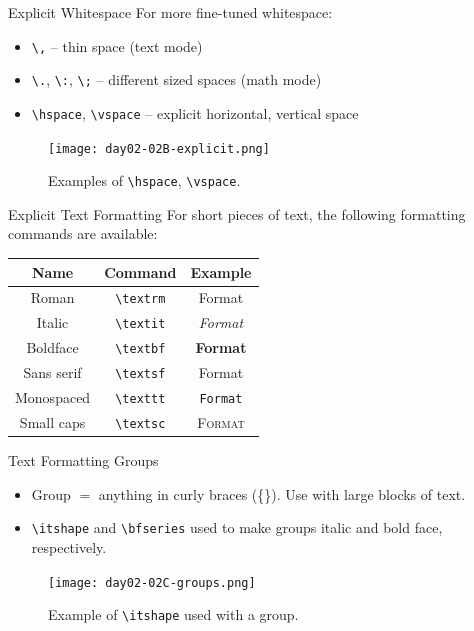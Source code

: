 \documentclass{beamer}
\begin{document}
{  \begin{frame}{Explicit Whitespace}
    For more fine-tuned whitespace:
    \begin{itemize}
      \item \texttt{\textbackslash,} -- thin space (text mode)
      \item \texttt{\textbackslash.}, \texttt{\textbackslash:}, \texttt{\textbackslash;} -- different sized spaces (math mode)
      \item \texttt{\textbackslash hspace}, \texttt{\textbackslash vspace} -- explicit horizontal, vertical space
    \end{itemize}
    \begin{figure}
      \texttt{[image: day02-02B-explicit.png]}
      \caption{Examples of \texttt{\textbackslash hspace}, \texttt{\textbackslash vspace}.}
      \label{fig:day02-02B}
    \end{figure}
  \end{frame}

  \begin{frame}{Explicit Text Formatting}
    For short pieces of text, the following formatting commands are available:
    \begin{table}
      \begin{tabular}{c|c|c}
        \textbf{Name} & \textbf{Command}               & \textbf{Example} \\ \hline
        Roman         & \texttt{\textbackslash textrm} & \textrm{Format} \\ \hline
        Italic        & \texttt{\textbackslash textit} & \textit{Format} \\ \hline
        Boldface      & \texttt{\textbackslash textbf} & \textbf{Format} \\ \hline
        Sans serif    & \texttt{\textbackslash textsf} & \textsf{Format} \\ \hline
        Monospaced    & \texttt{\textbackslash texttt} & \texttt{Format} \\ \hline
        Small caps    & \texttt{\textbackslash textsc} & \textsc{Format}
      \end{tabular}
    \end{table}
  \end{frame}

  \begin{frame}{Text Formatting Groups}
    \begin{itemize}
      \item Group $=$ anything in curly braces (\{\}). Use with large blocks of text.
      \item \texttt{\textbackslash itshape} and \texttt{\textbackslash bfseries} used to make groups italic and bold face, respectively.
    \end{itemize}
    \begin{figure}
      \texttt{[image: day02-02C-groups.png]}
      \caption{Example of \texttt{\textbackslash itshape} used with a group.}
      \label{fig:day02-02C}
    \end{figure}
  \end{frame}

}
\end{document}
